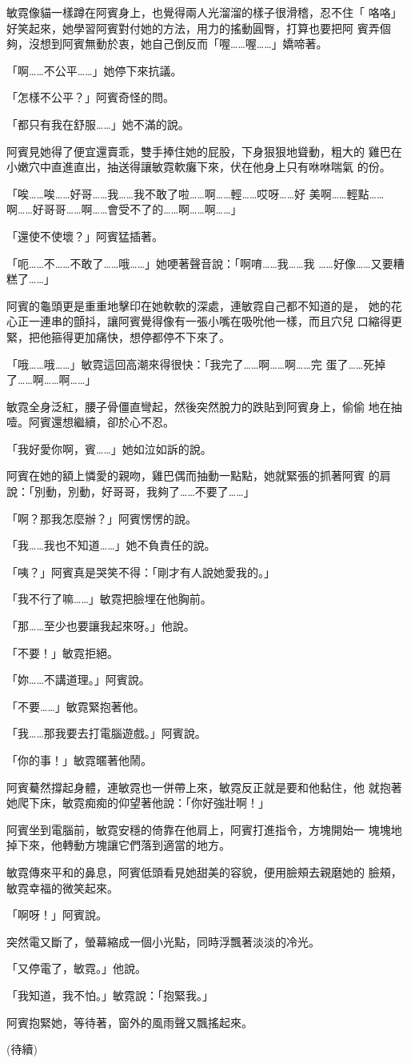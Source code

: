 敏霓像貓一樣蹲在阿賓身上，也覺得兩人光溜溜的樣子很滑稽，忍不住「
咯咯」好笑起來，她學習阿賓對付她的方法，用力的搖動圓臀，打算也要把阿
賓弄個夠，沒想到阿賓無動於衷，她自己倒反而「喔……喔……」嬌啼著。

「啊……不公平……」她停下來抗議。

「怎樣不公平？」阿賓奇怪的問。

「都只有我在舒服……」她不滿的說。

阿賓見她得了便宜還賣乖，雙手捧住她的屁股，下身狠狠地聳動，粗大的
雞巴在小嫩穴中直進直出，抽送得讓敏霓軟癱下來，伏在他身上只有咻咻喘氣
的份。

「唉……唉……好哥……我……我不敢了啦……啊……輕……哎呀……好
美啊……輕點……啊……好哥哥……啊……會受不了的……啊……啊……」

「還使不使壞？」阿賓猛插著。

「呃……不……不敢了……哦……」她哽著聲音說：「啊唷……我……我
……好像……又要糟糕了……」

阿賓的龜頭更是重重地擊印在她軟軟的深處，連敏霓自己都不知道的是，
她的花心正一連串的顫抖，讓阿賓覺得像有一張小嘴在吸吮他一樣，而且穴兒
口縮得更緊，把他箍得更加痛快，想停都停不下來了。

「哦……哦……」敏霓這回高潮來得很快：「我完了……啊……啊……完
蛋了……死掉了……啊……啊……」

敏霓全身泛紅，腰子骨僵直彎起，然後突然脫力的跌貼到阿賓身上，偷偷
地在抽噎。阿賓還想繼續，卻於心不忍。

「我好愛你啊，賓……」她如泣如訴的說。

阿賓在她的額上憐愛的親吻，雞巴偶而抽動一點點，她就緊張的抓著阿賓
的肩說：「別動，別動，好哥哥，我夠了……不要了……」

「啊？那我怎麼辦？」阿賓愣愣的說。

「我……我也不知道……」她不負責任的說。

「咦？」阿賓真是哭笑不得：「剛才有人說她愛我的。」

「我不行了嘛……」敏霓把臉埋在他胸前。

「那……至少也要讓我起來呀。」他說。

「不要！」敏霓拒絕。

「妳……不講道理。」阿賓說。

「不要……」敏霓緊抱著他。

「我……那我要去打電腦遊戲。」阿賓說。

「你的事！」敏霓暱著他鬧。

阿賓驀然撐起身體，連敏霓也一併帶上來，敏霓反正就是要和他黏住，他
就抱著她爬下床，敏霓痴痴的仰望著他說：「你好強壯啊！」

阿賓坐到電腦前，敏霓安穩的倚靠在他肩上，阿賓打進指令，方塊開始一
塊塊地掉下來，他轉動方塊讓它們落到適當的地方。

敏霓傳來平和的鼻息，阿賓低頭看見她甜美的容貌，便用臉頰去親磨她的
臉頰，敏霓幸福的微笑起來。

「啊呀！」阿賓說。

突然電又斷了，螢幕縮成一個小光點，同時浮飄著淡淡的冷光。

「又停電了，敏霓。」他說。

「我知道，我不怕。」敏霓說：「抱緊我。」

阿賓抱緊她，等待著，窗外的風雨聲又飄搖起來。


(待續)











